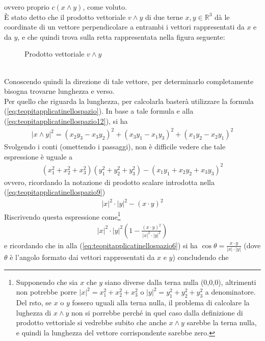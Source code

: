 \documentclass{book}
\newcommand{\abs}[1]{\lvert#1\rvert}
\theoremstyle{definition}
\theoremstyle{plain}
\begin{document}
ovvero proprio $c(x\wedge y)$, come voluto.\\
È stato detto che il prodotto vettoriale $v \wedge y$ di due terne $x,y\in \mathds{R}^3$ dà le coordinate di un vettore perpendicolare a entrambi i vettori rappresentati da $x$ e da $y$, e che quindi trova sulla retta rappresentata nella figura seguente:
  \begin{figure}[ht!]
    \centering
    \resizebox{5cm}{!}{
      
    }
    \caption{Prodotto vettoriale  $v \wedge y$}
    \label{fig:prodvectvwedgey}
  \end{figure}\\
  Conoscendo quindi la direzione di tale vettore, per determinarlo completamente bisogna trovarne lunghezza e verso.\\
  Per quello che riguarda la lunghezza, per calcolarla basterà utilizzare la formula (\ref{eq:teopitapplicatinellospazio}). In base a tale formula e alla (\ref{eq:teopitapplicatinellospazio12}), si ha
  \begin{eqnarray*}
    \abs{x\wedge y}^2=(x_2y_3-x_3y_2)^2+(x_3y_1-x_1y_3)^2+(x_1y_2-x_2y_1)^2
  \end{eqnarray*}
Svolgendo i conti (omettendo i passaggi), non è difficile vedere che tale espressione è uguale a
  \begin{eqnarray*}
    (x_1^2+x_2^2+x_3^2)(y_1^2+y_2^2+y_3^2)-(x_1y_1+x_2y_2+x_3y_3)^2
  \end{eqnarray*}
  ovvero, ricordando la notazione di prodotto scalare introdotta nella (\ref{eq:teopitapplicatinellospazio9})
  \begin{eqnarray*}
    \abs{x}^2\cdot\abs{y}^2-(x\cdot y)^2
  \end{eqnarray*}
  Riscrivendo questa espressione come\footnote{Supponendo che sia $x$ che $y$ siano diverse dalla terna nulla (0,0,0), altrimenti non potrebbe porre $\abs{x}^2=x_1^2+x_2^2+x_3^2$ o $\abs{y}^2=y_1^2+y_2^2+y_3^2$ a denominatore. Del rsto, se $x$ o $y$ fossero uguali alla terna nulla, il problema di calcolare la lughezza di $x\wedge y$ non si porrebbe perché in quel caso dalla definizione di prodotto vettoriale si vedrebbe subito che anche $x\wedge y$ sarebbe la terna nulla, e quindi la lunghezza del vettore corrispondente sarebbe zero.}
  \begin{eqnarray*}
    \abs{x}^2\cdot\abs{y}^2\left(1-\frac{(x\cdot y)^2}{\abs{x}^2\cdot\abs{y}^2}\right)
  \end{eqnarray*}
  e ricordando che in alla (\ref{eq:teopitapplicatinellospazio6}) si ha $\cos\theta=\frac{x\cdot y}{\abs{x}\cdot\abs{y}}$ (dove $\theta$ è l'angolo formato dai vettori rappresentati da $x$ e $y$) concludendo che
\end{document}
